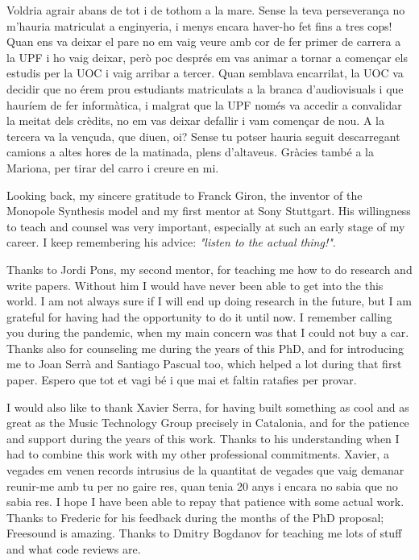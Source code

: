 Voldria agrair abans de tot i de tothom a la mare. Sense la teva perseverança no m'hauria matriculat a enginyeria, i menys encara haver-ho fet fins a tres cops! Quan ens va deixar el pare no em vaig veure amb cor de fer primer de carrera a la UPF i ho vaig deixar, però poc després em vas animar a tornar a començar els estudis per la UOC i vaig arribar a tercer. Quan semblava encarrilat, la UOC va decidir que no érem prou estudiants matriculats a la branca d'audiovisuals i que hauríem de fer informàtica, i malgrat que la UPF només va accedir a convalidar la meitat dels crèdits, no em vas deixar defallir i vam començar de nou. A la tercera va la vençuda, que diuen, oi? Sense tu potser hauria seguit descarregant camions a altes hores de la matinada, plens d'altaveus. Gràcies també a la Mariona, per tirar del carro i creure en mi.
  
Looking back, my sincere gratitude to Franck Giron, the inventor of the Monopole Synthesis model and my first mentor at Sony Stuttgart. His willingness to teach and counsel was very important, especially at such an early stage of my career. I keep remembering his advice: \textit{"listen to the actual thing!"}. 
 
Thanks to Jordi Pons, my second mentor, for teaching me how to do research and write papers. Without him I would have never been able to get into the this world. I am not always sure if I will end up doing research in the future, but I am grateful for having had the opportunity to do it until now. I remember calling you during the pandemic, when my main concern was that I could not buy a car. Thanks also for counseling me during the years of this PhD, and for introducing me to Joan Serrà and Santiago Pascual too, which helped a lot during that first paper. Espero que tot et vagi bé i que mai et faltin ratafies per provar. 

I would also like to thank Xavier Serra, for having built something as cool and as great as the Music Technology Group precisely in Catalonia, and for the patience and support during the years of this work. Thanks to his understanding when I had to combine this work with my other professional commitments. Xavier, a vegades em venen records intrusius de la quantitat de vegades que vaig demanar reunir-me amb tu per no gaire res, quan tenia 20 anys i encara no sabia que no sabia res.  I hope I have been able to repay that patience with some actual work. Thanks to Frederic for his feedback during the months of the PhD proposal; Freesound is amazing. Thanks to Dmitry Bogdanov for teaching me lots of stuff and what code reviews are.

